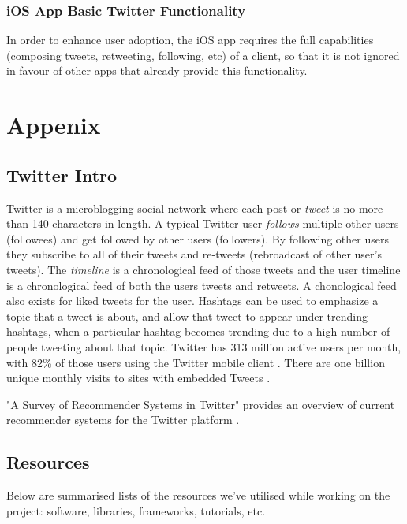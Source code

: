\documentclass{article}
\begin{document}
\subsubsection*{iOS App Basic Twitter Functionality} %
In order to enhance user adoption, the iOS app requires the full capabilities (composing tweets, retweeting, following, etc) of a client, so that it is not ignored in favour of other apps that already provide this functionality.


\newpage


\section{Appenix}

\subsection{Twitter Intro}
Twitter is a microblogging social network where each post or \textit{tweet} is no more than 140 characters in length. A typical Twitter user \textit{follows} multiple other users (followees) and get followed by other users (followers). By following other users they subscribe to all of their tweets and re-tweets (rebroadcast of other user's tweets). The \textit{timeline} is a chronological feed of those tweets and the user timeline is a chronological feed of both the users tweets and retweets. A chonological feed also exists for liked tweets for the user. Hashtags can be used to emphasize a topic that a tweet is about, and allow that tweet to appear under trending hashtags, when a particular hashtag becomes trending due to a high number of people tweeting about that topic. Twitter has 313 million active users per month, with 82\% of those users using the Twitter mobile client \cite{twitterabout}. There are one billion unique monthly visits to sites with embedded Tweets \cite{twitterabout}.

"A Survey of Recommender Systems in Twitter" provides an overview of current recommender systems for the Twitter platform \cite{paper4}.

\subsection{Resources}
Below are summarised lists of the resources we've utilised while working on the project: software, libraries, frameworks, tutorials, etc.
\end{document}

